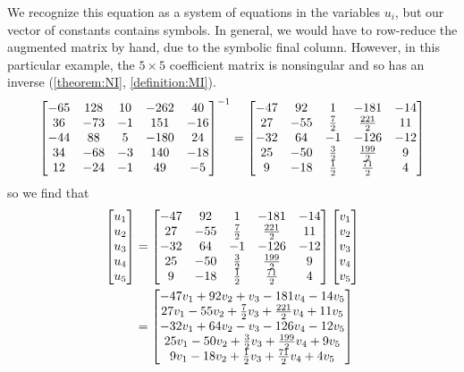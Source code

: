 \documentclass{ximera}
\begin{document}
\begin{example}
We recognize this equation as a system of equations in the variables $u_i$, but our vector of constants contains symbols.  In general, we would have to row-reduce the augmented matrix by hand, due to the symbolic final column.  However, in this particular example, the $5\times 5$ coefficient matrix is nonsingular and so has an inverse (\ref{theorem:NI}, \ref{definition:MI}).
\[
\inverse{
\begin{bmatrix}
-65&128&10&-262&40\\
36&-73&-1&151&-16\\
-44&88&5&-180&24\\
34&-68&-3&140&-18\\
12&-24&-1&49&-5
\end{bmatrix}
}
=
\begin{bmatrix}
-47 & 92 &  1 & -181 & -14 \\
 27 & -55 & \frac{7}{2} & \frac{221}{2} & 11\\
-32 & 64  & -1 &  -126 &  -12\\
 25 &  -50 &  \frac{3}{2} & \frac{199}{2} & 9 \\
 9 & -18 & \frac{1}{2} & \frac{71}{2} & 4
\end{bmatrix}
\]
so we find that
\begin{align*}
\begin{bmatrix}u_1\\u_2\\u_3\\u_4\\u_5\end{bmatrix}
&=
\begin{bmatrix}
-47 & 92 &  1 & -181 & -14 \\
 27 & -55 & \frac{7}{2} & \frac{221}{2} & 11\\
-32 & 64  & -1 &  -126 &  -12\\
 25 &  -50 &  \frac{3}{2} & \frac{199}{2} & 9 \\
 9 & -18 & \frac{1}{2} & \frac{71}{2} & 4
\end{bmatrix}
\begin{bmatrix}v_1\\v_2\\v_3\\v_4\\v_5\end{bmatrix}\\
&=
\begin{bmatrix}-47 v_1 + 92 v_2 + v_3 - 181 v_4 - 14 v_5\\
 27 v_1 - 55 v_2 + \frac{7}{2} v_3 + \frac{221}{2} v_4  + 11 v_5\\
-32 v_1 + 64  v_2 - v_3 - 126 v_4 - 12 v_5\\
 25 v_1 - 50 v_2 + \frac{3}{2} v_3 + \frac{199}{2} v_4 + 9 v_5\\
 9 v_1 - 18 v_2 + \frac{1}{2} v_3 + \frac{71}{2} v_4 + 4 v_5\end{bmatrix}
\end{align*}



\end{example}
\end{document}
